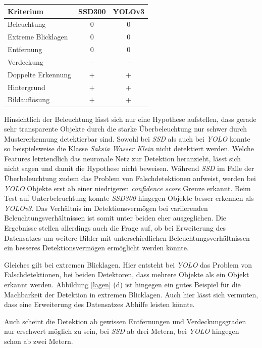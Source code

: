 \begin{center}
	\begin{tabular}[H]{l|c|c}
		Kriterium & SSD300 & YOLOv3 \\
		\hline
		Beleuchtung & 0 & 0 \\
		Extreme Blicklagen & 0 & 0 \\
		Entfernung & 0 & 0 \\
		Verdeckung & - & - \\
		Doppelte Erkennung & + & + \\
		Hintergrund & + & + \\
		Bildauflösung & + & + \\
	\end{tabular}
	\label{table:inference}
\end{center}

Hinsichtlich der Beleuchtung lässt sich nur eine Hypothese aufstellen, dass gerade sehr transparente Objekte durch die starke Überbeleuchtung nur schwer durch Mustererkennung detektierbar sind. Sowohl bei \textit{SSD} als auch bei \textit{YOLO} konnte so beispielsweise die Klasse \textit{Saksia Wasser Klein} nicht detektiert werden. Welche Features letztendlich das neuronale Netz zur Detektion heranzieht, lässt sich nicht sagen und damit die Hypothese nicht beweisen. Während \textit{SSD} im Falle der Überbeleuchtung zudem das Problem von Falschdetektionen aufweist, werden bei \textit{YOLO} Objekte erst ab einer niedrigeren \textit{confidence score} Grenze erkannt. Beim Test auf Unterbeleuchtung konnte \textit{SSD300} hingegen Objekte besser erkennen als \textit{YOLOv3}. Das Verhältnis im Detektionsvermögen bei variierenden Beleuchtungsverhältnissen ist somit unter beiden eher ausgeglichen. Die Ergebnisse stellen allerdings auch die Frage auf, ob bei Erweiterung des Datensatzes um weitere Bilder mit unterschiedlichen Beleuchtungsverhältnissen ein besseres Detektionsvermögen ermöglicht werden könnte.

Gleiches gilt bei extremen Blicklagen. Hier entsteht bei \textit{YOLO} das Problem von Falschdetektionen, bei beiden Detektoren, dass mehrere Objekte als ein Objekt erkannt werden. Abbildung \ref{lagen} (d) ist hingegen ein gutes Beispiel für die Machbarkeit der Detektion in extremen Blicklagen. Auch hier lässt sich vermuten, dass eine Erweiterung des Datensatzes Abhilfe leisten könnte.

Auch scheint die Detektion ab gewissen Entfernungen und Verdeckungsgraden nur erschwert möglich zu sein, bei \textit{SSD} ab drei Metern, bei \textit{YOLO} hingegen schon ab zwei Metern.

